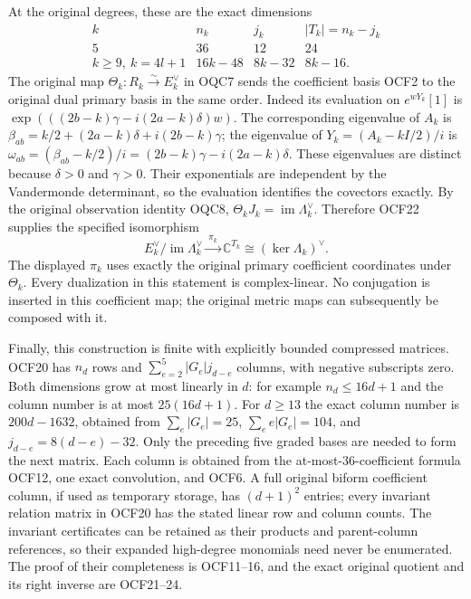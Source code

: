 \documentclass[11pt]{article}
\begin{document}
At the original degrees, these are the exact dimensions
\[
 \begin{array}{c|c|c|c}
 k&n_k&j_k&|T_k|=n_k-j_k\\\hline
 5&36&12&24\\
 k\geq9,\ k=4l+1&16k-48&8k-32&8k-16.
 \end{array}\tag{OCF23}
\]
The original map $\Theta_k:R_k\xrightarrow{\sim}E_k^\vee$
in OQC7 sends the coefficient basis OCF2 to the original dual
primary basis in the same order. Indeed its evaluation on
$e^{wY_k}[1]$ is
$\exp(((2b-k)\gamma-i(2a-k)\delta)w)$. The corresponding
eigenvalue of $A_k$ is
$\beta_{ab}=k/2+(2a-k)\delta+i(2b-k)\gamma$; the eigenvalue
of $Y_k=(A_k-kI/2)/i$ is
$\omega_{ab}=(\beta_{ab}-k/2)/i=(2b-k)\gamma-i(2a-k)\delta$.
These eigenvalues are distinct because
$\delta>0$ and $\gamma>0$. Their exponentials are independent
by the Vandermonde determinant, so the evaluation identifies the
covectors exactly. By the original observation identity OQC8,
$\Theta_kJ_k=\operatorname{im}\Lambda_k^\vee$. Therefore OCF22
supplies the specified isomorphism
\[
 E_k^\vee/\operatorname{im}\Lambda_k^\vee
       \xrightarrow{\ \pi_k\ }\mathbb C^{T_k}
       \cong (\ker\Lambda_k)^\vee.
 \tag{OCF24}
\]
The displayed $\pi_k$ uses exactly the original primary coefficient
coordinates under $\Theta_k$. Every dualization in this statement
is complex-linear. No conjugation is inserted in this coefficient
map; the original metric maps can subsequently be composed with it.

Finally, this construction is finite with explicitly bounded
compressed matrices. OCF20 has $n_d$ rows and
$\sum_{e=2}^5 |G_e|j_{d-e}$ columns, with negative subscripts zero.
Both dimensions grow at most linearly in $d$: for example
$n_d\leq16d+1$ and the column number is at most $25(16d+1)$.
For $d\geq13$ the exact column number is $200d-1632$, obtained
from $\sum_e|G_e|=25$, $\sum_e e|G_e|=104$, and
$j_{d-e}=8(d-e)-32$. Only the preceding five graded bases are
needed to form the next matrix. Each column is obtained from
the at-most-$36$-coefficient formula OCF12, one exact convolution,
and OCF6. A full original biform coefficient column, if used as
temporary storage, has $(d+1)^2$ entries; every invariant relation
matrix in OCF20 has the stated linear row and column counts.
The invariant certificates can be retained as their products and
parent-column references, so their expanded high-degree monomials
need never be enumerated. The proof of their completeness is
OCF11--16, and the exact original quotient and its right inverse
are OCF21--24.
\end{document}
